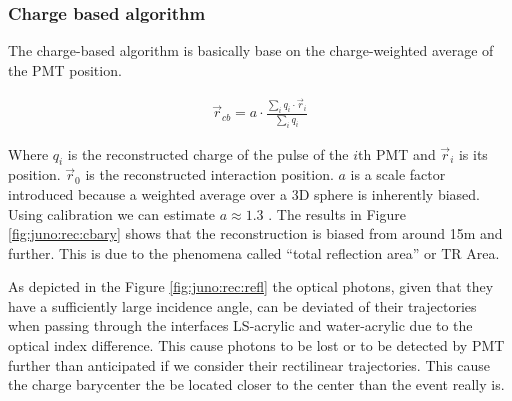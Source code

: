 \documentclass[../main.tex]{subfiles}
\begin{document}
\subsubsection{Charge based algorithm}

The charge-based algorithm is basically base on the charge-weighted average of the PMT position.

\begin{align}
  \vec{r}_{cb} = a\cdot\frac{\sum_i q_i \cdot \vec{r}_i}{\sum_i q_i}
\end{align}

Where $q_i$ is the reconstructed charge of the pulse of the $i$th PMT and $\vec{r}_i$ is its position. $\vec{r}_0$ is the reconstructed interaction position. $a$ is a scale factor introduced because a weighted average over a 3D sphere is inherently biased. Using calibration we can estimate $a \approx 1.3$ \cite{li_event_2021}. The results in Figure \ref{fig:juno:rec:cbary} shows that the reconstruction is biased from around 15m and further. This is due to the phenomena called ``total reflection area'' or TR Area.

As depicted in the Figure \ref{fig:juno:rec:refl} the optical photons, given that they have a sufficiently large incidence angle, can be deviated of their trajectories when passing through the interfaces LS-acrylic and water-acrylic due to the optical index difference. This cause photons to be lost or to be detected by PMT further than anticipated if we consider their rectilinear trajectories. This cause the charge barycenter the be located closer to the center than the event really is.
\end{document}
